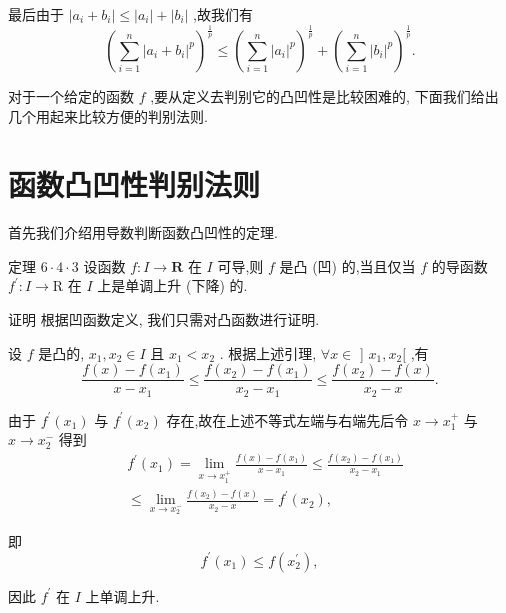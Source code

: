 最后由于 $\left| {{a}_{i} + {b}_{i}}\right|  \leq  \left| {a}_{i}\right|  + \left| {b}_{i}\right|$ ,故我们有
$${\left( \mathop{\sum }\limits_{{i = 1}}^{n}{\left| {a}_{i} + {b}_{i}\right| }^{p}\right) }^{\frac{1}{p}} \leq  {\left( \mathop{\sum }\limits_{{i = 1}}^{n}{\left| {a}_{i}\right| }^{p}\right) }^{\frac{1}{p}} + {\left( \mathop{\sum }\limits_{{i = 1}}^{n}{\left| {b}_{i}\right| }^{p}\right) }^{\frac{1}{p}}.$$

对于一个给定的函数 $f$ ,要从定义去判别它的凸凹性是比较困难的, 下面我们给出几个用起来比较方便的判别法则.

\section*{函数凸凹性判别法则}

首先我们介绍用导数判断函数凸凹性的定理.

定理 $6 \cdot  4 \cdot  3$ 设函数 $f : I \rightarrow  \mathbf{R}$ 在 $I$ 可导,则 $f$ 是凸 (凹) 的,当且仅当 $f$ 的导函数 ${f}^{\prime } : I \rightarrow  \mathrm{R}$ 在 $I$ 上是单调上升 (下降) 的.

证明 根据凹函数定义, 我们只需对凸函数进行证明.

设 $f$ 是凸的, ${x}_{1},{x}_{2} \in  I$ 且 ${x}_{1} < {x}_{2}$ . 根据上述引理, $\forall x \in$ ] ${x}_{1},{x}_{2}\lbrack$ ,有
$$\frac{f\left( x\right)  - f\left( {x}_{1}\right) }{x - {x}_{1}} \leq  \frac{f\left( {x}_{2}\right)  - f\left( {x}_{1}\right) }{{x}_{2} - {x}_{1}} \leq  \frac{f\left( {x}_{2}\right)  - f\left( x\right) }{{x}_{2} - x}.$$

由于 ${f}^{\prime }\left( {x}_{1}\right)$ 与 ${f}^{\prime }\left( {x}_{2}\right)$ 存在,故在上述不等式左端与右端先后令 $x \rightarrow  {x}_{1}^{ + }$ 与 $x \rightarrow  {x}_{2}^{ - }$ 得到
\begin{align*}
	&{f}^{\prime }\left( {x}_{1}\right)  = \mathop{\lim }\limits_{{x \rightarrow  {x}_{1}^{ + }}}\frac{f\left( x\right)  - f\left( {x}_{1}\right) }{x - {x}_{1}} \leq  \frac{f\left( {x}_{2}\right)  - f\left( {x}_{1}\right) }{{x}_{2} - {x}_{1}}\\
	&\leq  \mathop{\lim }\limits_{{x \rightarrow  {x}_{2}^{ - }}}\frac{f\left( {x}_{2}\right)  - f\left( x\right) }{{x}_{2} - x} = {f}^{\prime }\left( {x}_{2}\right) ,
\end{align*}

即
$${f}^{\prime }\left( {x}_{1}\right)  \leq  f\left( {x}_{2}^{\prime }\right) ,$$

因此 ${f}^{\prime }$ 在 $I$ 上单调上升.


